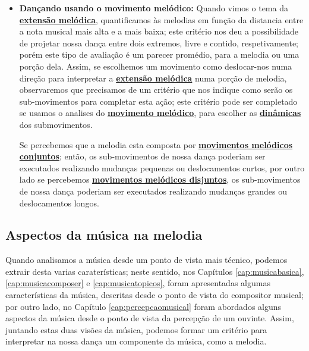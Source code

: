 \begin{itemize}
\item \textbf{Dançando usando o movimento melódico:}
Quando vimos o tema da \hyperref[ref:melodica:range]{\textbf{extensão melódica}},
quantificamos às melodias em função da distancia entre a nota musical mais alta e a mais baixa;
este critério nos deu a possibilidade de projetar nossa dança entre dois extremos,
livre e contido, respetivamente;
porém este tipo de avaliação é um parecer promédio,
para a melodia ou uma porção dela. 
Assim, se escolhemos um movimento como deslocar-nos numa direção 
para interpretar a \hyperref[ref:melodica:range]{\textbf{extensão melódica}} numa porção de melodia,
observaremos que precisamos de um critério que nos indique como serão os sub-movimentos para completar esta ação;
este critério pode ser completado se usamos o analises do \hyperref[ref:melodica:movimento]{\textbf{movimento melódico}},
para escolher as \hyperref[sec:musicalidade:dinamicas]{\textbf{dinâmicas}} dos submovimentos.
\begin{example}
Se percebemos que a melodia esta composta por 
\hyperref[ref:melodica:movimento:conjunto]{\textbf{movimentos melódicos conjuntos}};
então, 
os sub-movimentos de nossa dança poderiam ser executados realizando mudanças pequenas ou deslocamentos curtos,
por outro lado se percebemos \hyperref[ref:melodica:movimento:disjunto]{\textbf{movimentos melódicos disjuntos}},
os sub-movimentos de nossa dança poderiam ser executados realizando mudanças grandes ou deslocamentos longos.
\end{example}
\end{itemize}


 
\subsection{Aspectos da música na melodia} 
Quando analisamos a música desde um ponto de vista mais técnico, 
podemos extrair desta varias caraterísticas; 
neste sentido, nos Capítulos \ref{cap:musicabasica},
\ref{cap:musicacomposer} e \ref{cap:musicatopicos},
foram apresentadas algumas características da música, 
descritas desde o ponto de vista do compositor musical;
por outro lado, no Capítulo \ref{cap:percepcaomusical} 
foram abordados alguns aspectos da música desde o ponto de vista da percepção de um ouvinte.
Assim, juntando estas duas visões da música,
podemos formar um critério para interpretar  na nossa dança um componente da música, como a melodia.

